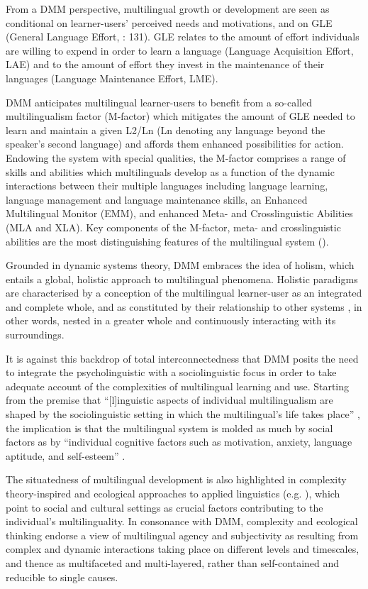 \documentclass[output=paper]{../langscibook}
\begin{document}
From a DMM perspective, multilingual growth or development are seen as conditional on learner-users’ perceived needs and motivations, and on GLE (General Language Effort, \citealt{HerdinaJessner2002}: 131). GLE relates to the amount of effort individuals are willing to expend in order to learn a language (Language Acquisition Effort, LAE) and to the amount of effort they invest in the maintenance of their languages (Language Maintenance Effort, LME). 

DMM anticipates multilingual learner-users to benefit from a so-called multilingualism factor (M-factor) which mitigates the amount of GLE needed to learn and maintain a given L2/Ln (Ln denoting any language beyond the speaker’s second language) and affords them enhanced possibilities for action.  Endowing the system with special qualities, the M-factor comprises a range of skills and abilities which multilinguals develop as a function of the dynamic interactions between their multiple languages including language learning, language management and language maintenance skills, an Enhanced Multilingual Monitor (EMM), and enhanced Meta- and Crosslinguistic Abilities (MLA and XLA). Key components of the M-factor, meta- and crosslinguistic abilities are the most distinguishing features of the multilingual system (\citealt{JessnerEtAl2018}). 

Grounded in dynamic systems theory, DMM embraces the idea of holism, which entails a global, holistic approach to multilingual phenomena. Holistic paradigms are characterised by a conception of the multilingual learner-user as an integrated and complete whole, and as constituted by their relationship to other systems \citep[44]{Philips2000}, in other words, nested in a greater whole and continuously interacting with its surroundings. 

It is against this backdrop of total interconnectedness that DMM posits the need to integrate the psycholinguistic with a sociolinguistic focus in order to take adequate account of the complexities of multilingual learning and use. Starting from the premise that “[l]inguistic aspects of individual multilingualism are shaped by the sociolinguistic setting in which the multilingual’s life takes place” \citep[273]{Jessner2008}, the implication is that the multilingual system is molded as much by social factors as by “individual cognitive factors such as motivation, anxiety, language aptitude, and self-esteem” \citep[274]{Jessner2008}. 

The situatedness of multilingual development is also highlighted in complexity theory-inspired and ecological approaches to applied linguistics (e.g. \citealt{Kramsch2012,Larsen-FreemanCameron2008,LaoireAronin2004}), which point to social and cultural settings as crucial factors contributing to the individual’s multilinguality. In consonance with DMM, complexity and ecological thinking endorse a view of multilingual agency and subjectivity as resulting from complex and dynamic interactions taking place on different levels and timescales, and thence as multifaceted and multi-layered, rather than self-contained and reducible to single causes.
\end{document}
